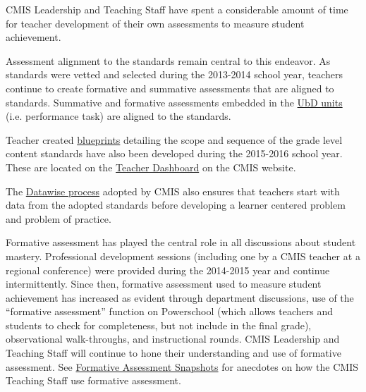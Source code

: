 \documentclass{report}
\begin{document}
\begin{findings}
CMIS Leadership and Teaching Staff have spent a considerable amount of time for teacher development of their own assessments to measure student achievement. 

Assessment alignment to the standards remain central to this endeavor.  As standards were vetted and selected during the 2013-2014 school  year, teachers continue to create formative and summative assessments that are aligned to standards. Summative and formative assessments embedded in the \href{https://docs.google.com/a/cmis.ac.th/document/d/1kL1VjwfuMMa7NaWmwUrEah1BM-jJRmLAd4VJzR3HoPs/edit?usp=sharing}{UbD units} (i.e. performance task) are aligned to the standards. 

Teacher created \href{https://drive.google.com/drive/folders/0ByVFfrm0zfolfmV1QTNuWFdUVHV3dDVrRFMzUFBMazY0VGs1eWc0cmFjVGcwNDdsQkdrZzA?usp=sharing}{blueprints} detailing the scope and sequence of the grade level content standards have also been developed during the 2015-2016 school year. These are located on the \href{http://www.cmis.ac.th/}{Teacher Dashboard} on the CMIS website. 

The \href{https://drive.google.com/drive/folders/0ByVFfrm0zfolMkE4OEhyVHBNbmM?usp=sharing}{Datawise process} adopted by CMIS also ensures that teachers start with data from the adopted standards before developing a learner centered problem and problem of practice. 

Formative assessment has played the central role in all discussions about student mastery. Professional development sessions (including one by a CMIS teacher at a regional conference) were provided during the 2014-2015 year and continue intermittently. Since then, formative assessment used to measure student achievement has increased as evident through department discussions, use of the “formative assessment” function on Powerschool (which allows teachers and students to check for completeness, but not include in the final grade), observational walk-throughs, and instructional rounds. CMIS Leadership and Teaching Staff will continue to hone their understanding and use of formative assessment. See \href{https://docs.google.com/a/cmis.ac.th/document/d/1yPhINDe21ApcJp3psbSCgmS9PHEBbxrCflrR2Adnwho/edit?usp=sharing}{Formative Assessment Snapshots} for anecdotes on how the CMIS Teaching Staff use formative assessment. 


\end{findings}
\end{document}
